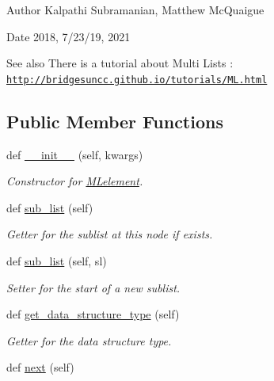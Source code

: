 \begin{DoxyAuthor}{Author}
Kalpathi Subramanian, Matthew Mc\+Quaigue
\end{DoxyAuthor}
\begin{DoxyDate}{Date}
2018, 7/23/19, 2021
\end{DoxyDate}
\begin{DoxySeeAlso}{See also}
There is a tutorial about Multi Lists \+: \href{http://bridgesuncc.github.io/tutorials/ML.html}{\tt http\+://bridgesuncc.\+github.\+io/tutorials/\+M\+L.\+html} 
\end{DoxySeeAlso}
\subsection*{Public Member Functions}
\begin{DoxyCompactItemize}
\item 
def \hyperlink{classbridges_1_1ml__element_1_1_m_lelement_ae0242b9e3f2d7d7ccc702ef0bc7a61ba}{\+\_\+\+\_\+init\+\_\+\+\_\+} (self, kwargs)
\begin{DoxyCompactList}\small\item\em Constructor for \hyperlink{classbridges_1_1ml__element_1_1_m_lelement}{M\+Lelement}. \end{DoxyCompactList}\item 
def \hyperlink{classbridges_1_1ml__element_1_1_m_lelement_a1b02783280dacd20982bb06a1e3070f4}{sub\+\_\+list} (self)
\begin{DoxyCompactList}\small\item\em Getter for the sublist at this node if exists. \end{DoxyCompactList}\item 
def \hyperlink{classbridges_1_1ml__element_1_1_m_lelement_a8ad12079b474fb676f49aed7bacd5e10}{sub\+\_\+list} (self, sl)
\begin{DoxyCompactList}\small\item\em Setter for the start of a new sublist. \end{DoxyCompactList}\item 
def \hyperlink{classbridges_1_1ml__element_1_1_m_lelement_a97693d616263a8ee59b066829e8ce7e8}{get\+\_\+data\+\_\+structure\+\_\+type} (self)
\begin{DoxyCompactList}\small\item\em Getter for the data structure type. \end{DoxyCompactList}\item 
def \hyperlink{classbridges_1_1ml__element_1_1_m_lelement_a951d30261514e6eaefdd7d60f1c77f73}{next} (self)

\end{DoxyCompactItemize}
